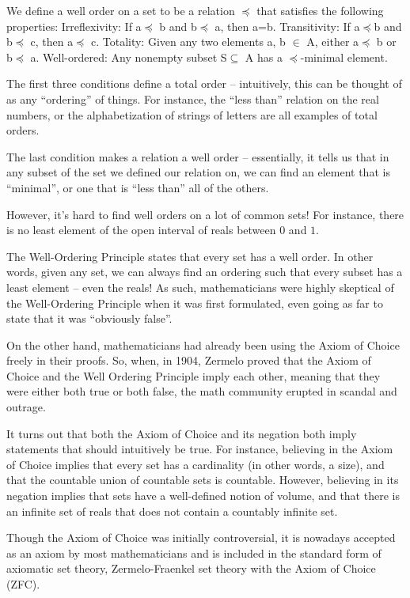 \documentclass{article}
\begin{document}
\begin{multicols}{3}
We define a well order on a set to be a relation $\preceq$ that satisfies the following properties:
Irreflexivity: If a$\preceq$ b and b$\preceq$ a, then a=b.
Transitivity: If a$\preceq$b and b$\preceq$ c, then a$\preceq$ c.
Totality: Given any two elements a, b $\in$ A, either a$\preceq$ b or b$\preceq$ a.
Well-ordered: Any nonempty subset S$\subseteq$ A has a $\preceq$-minimal element.

The first three conditions define a total order – intuitively, this can be thought of as any “ordering” of things. For instance, the “less than” relation on the real numbers, or the alphabetization of strings of letters are all examples of total orders. 

The last condition makes a relation a well order – essentially, it tells us that in any subset of the set we defined our relation on, we can find an element that is “minimal”, or one that is “less than” all of the others.

However, it’s hard to find well orders on a lot of common sets! For instance, there is no least element of the open interval of reals between $0$ and $1$. 

The Well-Ordering Principle states that every set has a well order. In other words, given any set, we can always find an ordering such that every subset has a least element – even the reals! As such, mathematicians were highly skeptical of the Well-Ordering Principle when it was first formulated, even going as far to state that it was “obviously false”.

On the other hand, mathematicians had already been using the Axiom of Choice freely in their proofs. So, when, in 1904, Zermelo proved that the Axiom of Choice and the Well Ordering Principle imply each other, meaning that they were either both true or both false, the math community erupted in scandal and outrage. 

It turns out that both the Axiom of Choice and its negation both imply statements that should intuitively be true. For instance, believing in the Axiom of Choice implies that every set has a cardinality (in other words, a size), and that the countable union of countable sets is countable. However, believing in its negation implies that sets have a well-defined notion of volume, and that there is an infinite set of reals that does not contain a countably infinite set. 

Though the Axiom of Choice was initially controversial, it is nowadays accepted as an axiom by most mathematicians and is included in the standard form of axiomatic set theory, Zermelo-Fraenkel set theory with the Axiom of Choice (ZFC).
\closearticle


\end{multicols}
\end{document}
